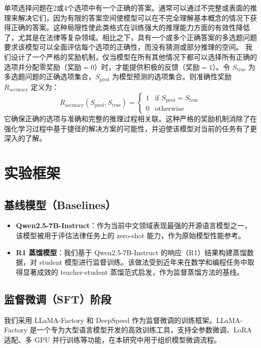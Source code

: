 \documentclass{pkuthesis}
\begin{document}
单项选择问题在2或4个选项中有一个正确的答案。通常可以通过不完整或表面的推理来解决它们，因为有限的答案空间使模型可以在不完全理解基本概念的情况下获得正确的答案。这种局限性使此类格式在训练强大的推理能力方面的有效性降低了，尤其是在法律等复杂领域。相比之下，具有一个或多个正确答案的多选题问题要求该模型可以全面评估每个选项的正确性，而没有猜测或部分推理的空间。
我们设计了一个严格的奖励机制，仅当模型在所有其他情况下都可以选择所有正确的选项并分配零奖励（奖励$=0$）时，才能提供积极的反馈（奖励$=1$）。令 $S_{\text{true}}$ 为多选题问题的正确选项集合，$S_{\text{pred}}$ 为模型预测的选项集合。则准确性奖励 $R_{\text{accuracy}}$ 定义为：
$$ R_{\text{accuracy}}(S_{\text{pred}}, S_{\text{true}}) = \begin{cases} 1 & \text{if } S_{\text{pred}} = S_{\text{true}} \\ 0 & \text{otherwise} \end{cases} $$
它确保正确的选项与准确和完整的推理过程相关联。这种严格的奖励机制消除了在强化学习过程中基于捷径的解决方案的可能性，并迫使该模型对当前的任务有了更深入的了解。


\section{实验框架}


\subsection{基线模型（Baselines）}

\begin{itemize}
\item \textbf{Qwen2.5-7B-Instruct}：作为当前中文领域表现最强的开源语言模型之一\cite{yang2024qwen2}，该模型被用于评估法律任务上的 zero-shot 能力，作为原始模型性能参考。

\item \textbf{R1 蒸馏模型}：我们基于 Qwen2.5-7B-Instruct 的响应（R1）结果构建蒸馏数据，对 student 模型进行监督训练。该做法受到近年来在数学和编程任务中取得显著成效的 teacher-student 蒸馏范式启发\cite{guo2025deepseek}，作为监督蒸馏方法的基线。

\end{itemize}

\subsection{监督微调（SFT）阶段}

我们采用 LLaMA-Factory 和 DeepSpeed 作为监督微调的训练框架。LLaMA-Factory 是一个专为大型语言模型开发的高效训练工具，支持全参数微调、LoRA 适配、多 GPU 并行训练等功能\cite{llamafactory}，在本研究中用于组织模型微调流程。
\end{document}
